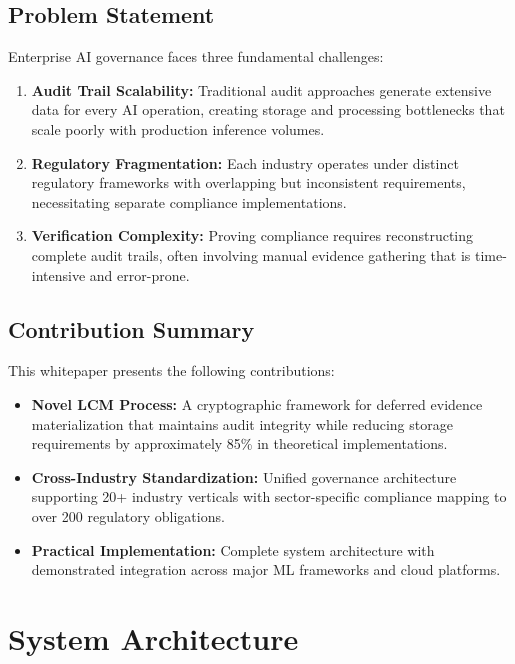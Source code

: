 \documentclass[12pt,a4paper]{article}
\begin{document}
\subsection{Problem Statement}

Enterprise AI governance faces three fundamental challenges:

\begin{enumerate}
\item \textbf{Audit Trail Scalability:} Traditional audit approaches generate extensive data for every AI operation, creating storage and processing bottlenecks that scale poorly with production inference volumes.

\item \textbf{Regulatory Fragmentation:} Each industry operates under distinct regulatory frameworks with overlapping but inconsistent requirements, necessitating separate compliance implementations.

\item \textbf{Verification Complexity:} Proving compliance requires reconstructing complete audit trails, often involving manual evidence gathering that is time-intensive and error-prone.
\end{enumerate}

\subsection{Contribution Summary}

This whitepaper presents the following contributions:

\begin{itemize}
\item \textbf{Novel LCM Process:} A cryptographic framework for deferred evidence materialization that maintains audit integrity while reducing storage requirements by approximately 85\% in theoretical implementations.

\item \textbf{Cross-Industry Standardization:} Unified governance architecture supporting 20+ industry verticals with sector-specific compliance mapping to over 200 regulatory obligations.

\item \textbf{Practical Implementation:} Complete system architecture with demonstrated integration across major ML frameworks and cloud platforms.
\end{itemize}

\section{System Architecture}
\end{document}
